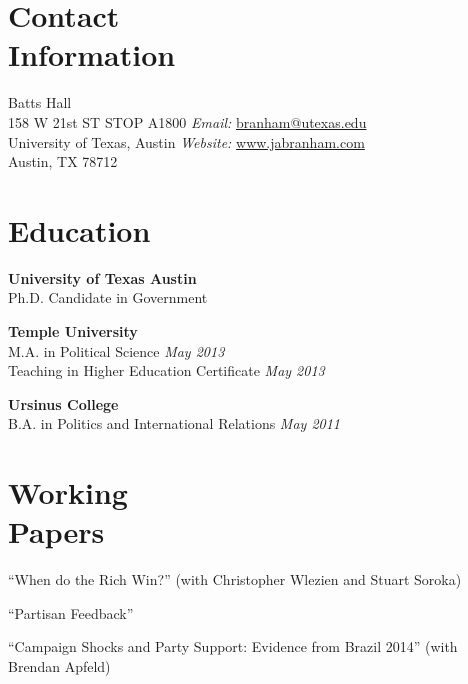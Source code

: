 \documentclass[margin,line]{res}
\newenvironment{list2}{
    \begin{list}{--}{%
        \setlength{\itemsep}{0in}
        \setlength{\parsep}{0in} \setlength{\parskip}{0in}
        \setlength{\topsep}{0in} \setlength{\partopsep}{0in}
        \setlength{\leftmargin}{0.2in}}}{\end{list}}
\begin{document}

\begin{resume}


\section{\sc Contact \\Information}
Batts Hall \hfill     \\
158 W 21st ST STOP A1800 \hfill \emph{Email:} \href{mailto:branham@utexas.edu}{branham@utexas.edu} \\
University of Texas, Austin \hfill \emph{Website:} \href{www.jabranham.com}{www.jabranham.com} \\
Austin, TX 78712 \hfill


\section{\sc Education}
\textbf{University of Texas Austin}     \hfill     \\
 Ph.D. Candidate in Government       \hfill 

\textbf{Temple University} \hfill  \\
M.A. in Political Science  \hfill     \emph{May 2013} \\
Teaching in Higher Education Certificate \hfill \emph{May 2013}

\textbf{Ursinus College}   \hfill     \\ 
B.A. in Politics and International Relations    \hfill      \emph{May 2011} \\

\section{\sc Working\\Papers}
\begin{list2}
\item ``When do the Rich Win?'' (with Christopher Wlezien and Stuart Soroka)
\item ``Partisan Feedback''
\item ``Campaign Shocks and Party Support: Evidence from Brazil 2014'' (with Brendan Apfeld)
\end{list2}


\end{resume}
\end{document}
